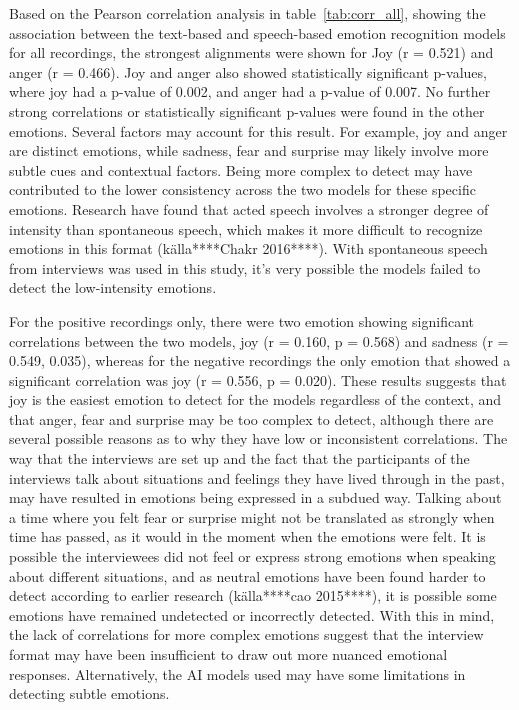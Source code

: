 Based on the Pearson correlation analysis in table~\ref{tab:corr_all}, showing the association between the text-based and speech-based emotion recognition models for all recordings, the strongest alignments were shown for Joy (r = 0.521) and anger (r = 0.466). Joy and anger also showed statistically significant p-values, where joy had a p-value of 0.002, and anger had a p-value of 0.007. No further strong correlations or statistically significant p-values were found in the other emotions. Several factors may account for this result. For example, joy and anger are distinct emotions, while sadness, fear and surprise may likely involve more subtle cues and contextual factors. Being more complex to detect may have contributed to the lower consistency across the two models for these specific emotions. Research have found that acted speech involves a stronger degree of intensity than spontaneous speech, which makes it more difficult to recognize emotions in this format (källa****Chakr 2016****). With spontaneous speech from interviews was used in this study, it’s very possible the models failed to detect the low-intensity emotions.

For the positive recordings only, there were two emotion showing significant correlations between the two models, joy (r = 0.160, p = 0.568) and sadness (r = 0.549, 0.035), whereas for the negative recordings the only emotion that showed a significant correlation was joy (r = 0.556, p = 0.020). These results suggests that joy is the easiest emotion to detect for the models regardless of the context, and that anger, fear and surprise may be too complex to detect, although there are several possible reasons as to why they have low or inconsistent correlations. The way that the interviews are set up and the fact that the participants of the interviews talk about situations and feelings they have lived through in the past, may have resulted in emotions being expressed in a subdued way. Talking about a time where you felt fear or surprise might not be translated as strongly when time has passed, as it would in the moment when the emotions were felt. It is possible the interviewees did not feel or express strong emotions when speaking about different situations, and as neutral emotions have been found harder to detect according to earlier research (källa****cao 2015****), it is possible some emotions have remained undetected or incorrectly detected. With this in mind, the lack of correlations for more complex emotions suggest that the interview format may have been insufficient to draw out more nuanced emotional responses. Alternatively, the AI models used may have some limitations in detecting subtle emotions.



